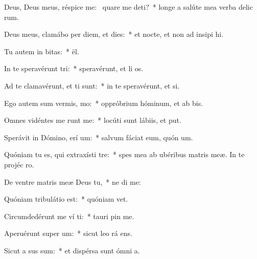 \item Deus, Deus meus, réspice  me:~\pscross{} quare me deti?~* longe a salúte mea verba delic rum.
\item Deus meus, clamábo per diem, et  dies:~* et nocte, et non ad insipi hi.
\item Tu autem in  bitas:~*  ël.
\item In te speravérunt  tri:~* speravérunt, et li os.
\item Ad te clamavérunt, et  ti sunt:~* in te speravérunt, et   si.
\item Ego autem sum vermis,   mo:~* oppróbrium hóminum, et ab bis.
\item Omnes vidéntes me runt me:~* locúti sunt lábiis, et  put.
\item Sperávit in Dómino, erí um:~* salvum fáciat eum, quón  um.
\item Quóniam tu es, qui extraxísti   tre:~* spes mea ab ubéribus matris meæ. In te projéc   ro.
\item De ventre matris meæ Deus   tu,~* ne di  me:
\item Quóniam tribulátio  est:~* quóniam    vet.
\item Circumdedérunt me ví ti:~* tauri pin  me.
\item Aperuérunt super   um:~* sicut leo rá  ens.
\item Sicut a sus sum:~* et dispérsa sunt ómni  a.
